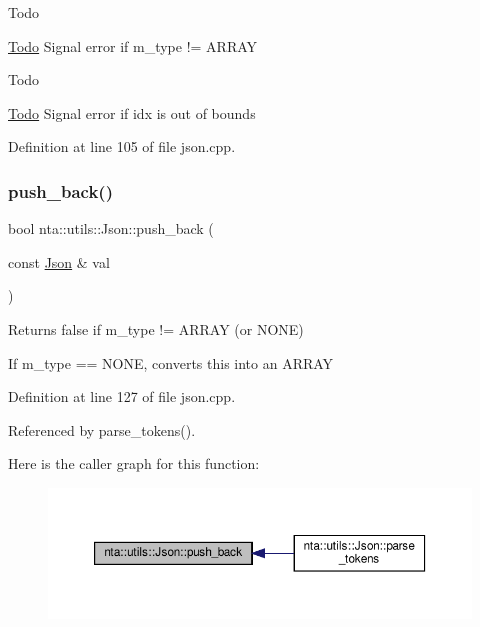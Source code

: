 \begin{DoxyRefDesc}{Todo}
\item[\hyperlink{todo__todo000021}{Todo}]Signal error if m\+\_\+type != A\+R\+R\+AY \end{DoxyRefDesc}
\begin{DoxyRefDesc}{Todo}
\item[\hyperlink{todo__todo000022}{Todo}]Signal error if idx is out of bounds \end{DoxyRefDesc}


Definition at line 105 of file json.\+cpp.

\mbox{\label{classnta_1_1utils_1_1Json_a2015e471fd47c1a077ca752c9b1fabbd}} 
\subsubsection{\texorpdfstring{push\+\_\+back()}{push\_back()}}
{\footnotesize\ttfamily bool nta\+::utils\+::\+Json\+::push\+\_\+back (\begin{DoxyParamCaption}\item[{const \hyperlink{classnta_1_1utils_1_1Json}{Json} \&}]{val }\end{DoxyParamCaption})}

Returns false if m\+\_\+type != A\+R\+R\+AY (or N\+O\+NE)

If m\+\_\+type == N\+O\+NE, converts this into an A\+R\+R\+AY 

Definition at line 127 of file json.\+cpp.



Referenced by parse\+\_\+tokens().

Here is the caller graph for this function\+:\nopagebreak
\begin{figure}[H]
\begin{center}
\leavevmode
\includegraphics[width=350pt]{d1/d3d/classnta_1_1utils_1_1Json_a2015e471fd47c1a077ca752c9b1fabbd_icgraph}
\end{center}
\end{figure}
\mbox{\label{classnta_1_1utils_1_1Json_a19f47693bafb5d8e0fe384e0357d0da1}} 
